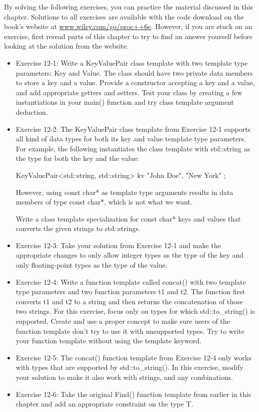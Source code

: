 By solving the following exercises, you can practice the material discussed in this chapter. Solutions to all exercises are available with the code download on the book’s website at \url{www.wiley.com/go/proc++6e}. However, if you are stuck on an exercise, first reread parts of this chapter to try to find an answer yourself before looking at the solution from the website.

\begin{itemize}
\item
Exercise 12-1: Write a KeyValuePair class template with two template type parameters: Key and Value. The class should have two private data members to store a key and a value. Provide a constructor accepting a key and a value, and add appropriate getters and setters. Test your class by creating a few instantiations in your main() function and try class template argument deduction.

\item
Exercise 12-2: The KeyValuePair class template from Exercise 12-1 supports all kind of data types for both its key and value template type parameters. For example, the following instantiates the class template with std::string as the type for both the key and the value:

\begin{cpp}
KeyValuePair<std::string, std::string> kv { "John Doe", "New York" };
\end{cpp}

However, using const char* as template type arguments results in data members of type const char*, which is not what we want.

Write a class template specialization for const char* keys and values that converts the given strings to std::strings.

\item
Exercise 12-3: Take your solution from Exercise 12-1 and make the appropriate changes to only allow integer types as the type of the key and only floating-point types as the type of the value.

\item
Exercise 12-4: Write a function template called concat() with two template type parameters and two function parameters t1 and t2. The function first converts t1 and t2 to a string and then returns the concatenation of those two strings. For this exercise, focus only on types for which std::to\_string() is supported. Create and use a proper concept to make sure users of the function template don’t try to use it with unsupported types. Try to write your function template without using the template keyword.

\item
Exercise 12-5: The concat() function template from Exercise 12-4 only works with types that are supported by std::to\_string(). In this exercise, modify your solution to make it also work with strings, and any combinations.

\item
Exercise 12-6: Take the original Find() function template from earlier in this chapter and add an appropriate constraint on the type T.
\end{itemize}